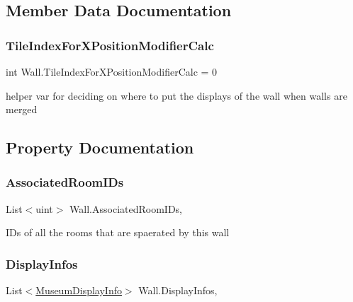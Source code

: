 \subsection{Member Data Documentation}
\mbox{\label{class_wall_a0923767dab07b7c3018ce3a6ceacd306}} 
\subsubsection{\texorpdfstring{Tile\+Index\+For\+X\+Position\+Modifier\+Calc}{TileIndexForXPositionModifierCalc}}
{\footnotesize\ttfamily int Wall.\+Tile\+Index\+For\+X\+Position\+Modifier\+Calc = 0\hspace{0.3cm}{\ttfamily [private]}}



helper var for deciding on where to put the displays of the wall when walls are merged 



\subsection{Property Documentation}
\mbox{\label{class_wall_aa49042aeda37b3ad734a101f1df834eb}} 
\subsubsection{\texorpdfstring{Associated\+Room\+I\+Ds}{AssociatedRoomIDs}}
{\footnotesize\ttfamily List$<$uint$>$ Wall.\+Associated\+Room\+I\+Ds\hspace{0.3cm}{\ttfamily [get]}, {}}



I\+Ds of all the rooms that are spaerated by this wall 

\mbox{\label{class_wall_a5fc68c5010cd944a5103f84a749e87f7}} 
\subsubsection{\texorpdfstring{Display\+Infos}{DisplayInfos}}
{\footnotesize\ttfamily List$<$\mbox{\hyperlink{class_museum_display_info}{Museum\+Display\+Info}}$>$ Wall.\+Display\+Infos\hspace{0.3cm}{\ttfamily [get]}, {}}



